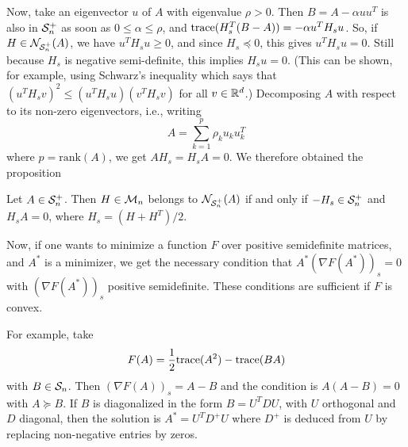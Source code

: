 Now, take an eigenvector $u$ of $A$ with eigenvalue $\rho>0$. Then $B = A - \alpha uu^T$ is also in ${\mathcal S}_n^+$ as soon as $0 \leq \alpha \leq \rho$, and ${\mathrm{trace}}(H_s^T (B-A))  = - \alpha u^T H_s u$. So, if $H \in {\mathcal N}_{{\mathcal S}^+_n}(A)$, we have  $u^T H_s u \geq 0$, and since $H_s \preceq 0$, this gives $u^T H_s u = 0$. Still because $H_s$ is negative semi-definite, this implies $H_s u = 0$. (This can be shown, for example, using Schwarz's inequality which says that $(u^T H_s v)^2 \leq (u^T H_s u) (v^T H_s v)$ for all $v\in {\mathbb{R}}^d$.) Decomposing $A$ with respect to its non-zero eigenvectors, i.e., writing
\[
A = \sum_{k=1}^p \rho_k u_ku_k^T
\]
where $p = \mathrm{rank}(A)$, we get $AH_s = H_s A = 0$. We therefore obtained the proposition
\begin{proposition}
\label{prop:semidefinite.normal}
Let $A \in {\mathcal S}^+_n$. Then $H\in {\mathcal M}_{n}$ belongs to ${\mathcal N}_{{\mathcal S}^+_n}(A)$ if and only if $-H_s \in {\mathcal S}_n^+$ and $H_s A = 0$, where $H_s = (H+H^T)/2$.
\end{proposition}
%
% 
%  
%

Now, if one wants to minimize a function $F$ over positive semidefinite matrices, and $A^*$ is a minimizer, we get the necessary condition that $A^* (\nabla F(A^*))_s = 0 $ with  $(\nabla F(A^*))_s$ positive semidefinite. These conditions are sufficient if $F$ is convex. 

For example, 
take
\begin{equation}
\label{eq:semi.definite.example}
F(A) = \frac{1}{2} {\mathrm{trace}}(A^2) - {\mathrm{trace}}(BA)
\end{equation}
with $B\in {\mathcal S}_n$. Then $(\nabla F(A))_s = A -B$ and the condition is $A(A-B) = 0$ with $A \succeq B$. If $B$ is diagonalized in the form $B = U^T D U$, with $U$ orthogonal and $D$ diagonal, then the solution is $A^* = U^T D^+ U$ where $D^+$ is deduced from $U$ by replacing non-negative entries by zeros.


